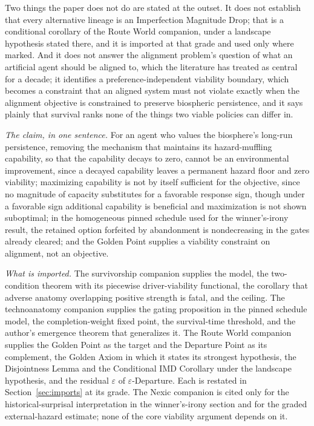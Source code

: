 Two things the paper does not do are stated at the outset. It does not
establish that every alternative lineage is an Imperfection Magnitude
Drop; that is a conditional corollary of the Route World companion,
under a landscape hypothesis stated there, and it is imported at that
grade and used only where marked. And it does not answer the alignment
problem's question of what an artificial agent should be aligned to,
which the literature has treated as central for a decade; it identifies a
preference-independent viability boundary, which becomes a constraint
that an aligned system must not violate exactly when the alignment
objective is constrained to preserve biospheric persistence, and it
says plainly that survival ranks none of the things two viable policies
can differ in.

\emph{The claim, in one sentence.} For an agent who values the
biosphere's long-run persistence, removing the mechanism that
maintains its hazard-muffling capability, so that the capability decays
to zero, cannot be an environmental improvement, since a decayed
capability leaves a permanent hazard floor and zero viability;
maximizing capability is not by itself sufficient for the objective, since no magnitude of capacity substitutes for a favorable response sign, though under a favorable sign additional capability is beneficial and maximization is not shown suboptimal; in the
homogeneous pinned schedule used for the winner's-irony result, the
retained option forfeited by abandonment is nondecreasing in the gates
already cleared; and the Golden Point supplies a viability constraint on
alignment, not an objective.

\emph{What is imported.} The survivorship companion \cite{GoldenSurvivorship}
supplies the model, the two-condition theorem with its piecewise
driver-viability functional, the corollary that adverse anatomy
overlapping positive strength is fatal, and the ceiling. The
technoanatomy companion \cite{GoldenTechnoanatomy} supplies the gating proposition
in the pinned schedule model, the completion-weight fixed point, the
survival-time threshold, and the author's emergence theorem that
generalizes it. The Route World companion \cite{GoldenRouteWorld}
supplies the Golden Point as the target and the Departure Point as its
complement, the Golden Axiom in which it states its strongest
hypothesis, the Disjointness Lemma and the Conditional IMD Corollary
under the landscape hypothesis, and the residual $\varepsilon$ of
$\varepsilon$-Departure. Each is restated in Section~\ref{sec:imports}
at its grade. The Nexic companion \cite{Nexus} is cited only for the
historical-surprisal interpretation in the winner's-irony section and
for the graded external-hazard estimate; none of the core viability
argument depends on it.

